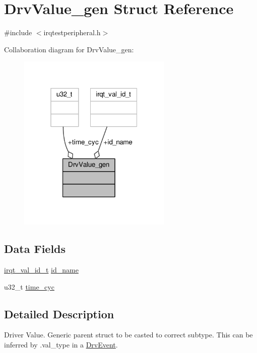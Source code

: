 \hypertarget{struct_drv_value__gen}{}\section{Drv\+Value\+\_\+gen Struct Reference}
\label{struct_drv_value__gen}


{\ttfamily \#include $<$irqtestperipheral.\+h$>$}



Collaboration diagram for Drv\+Value\+\_\+gen\+:\nopagebreak
\begin{figure}[H]
\begin{center}
\leavevmode
\includegraphics[width=208pt]{struct_drv_value__gen__coll__graph}
\end{center}
\end{figure}
\subsection*{Data Fields}
\begin{DoxyCompactItemize}
\item 
\hyperlink{irqtestperipheral_8h_a3485d29696b63704b7a6454519c3d0c5}{irqt\+\_\+val\+\_\+id\+\_\+t} \hyperlink{struct_drv_value__gen_a5226c1d3c4b403e66022cb0a73132166}{id\+\_\+name}
\item 
u32\+\_\+t \hyperlink{struct_drv_value__gen_a916ebe230253097fafdb1a2d73b1a44d}{time\+\_\+cyc}
\end{DoxyCompactItemize}


\subsection{Detailed Description}
Driver Value. Generic parent struct to be casted to correct subtype. This can be inferred by .val\+\_\+type in a \hyperlink{struct_drv_event}{Drv\+Event}. 


